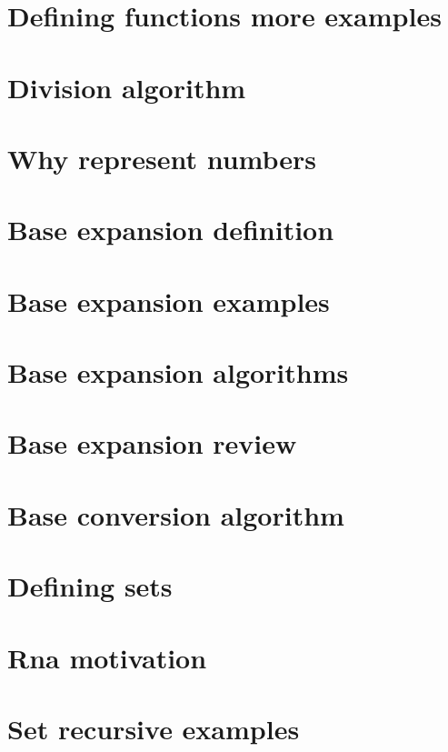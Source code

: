 
\section*{Defining functions more examples}

\vfill
\section*{Division algorithm}

\vfill
\section*{Why represent numbers}

\vfill
\section*{Base expansion definition}

\vfill
\section*{Base expansion examples}

\vfill
\section*{Base expansion algorithms}

\vfill
\section*{Base expansion review}

\vfill
\section*{Base conversion algorithm}

\vfill
\section*{Defining sets}

\vfill
\section*{Rna motivation}

\vfill
\section*{Set recursive examples}

\vfill
